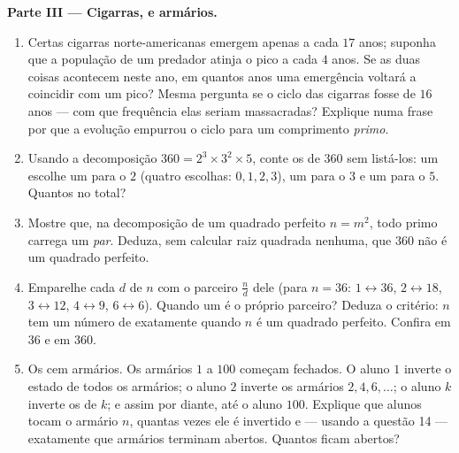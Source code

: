 \begin{problem}
\medskip
\noindent\textbf{Parte III --- Cigarras,  e armários.}
\begin{enumerate}[resume]
  \item Certas cigarras norte-americanas emergem apenas a cada $17$
        anos; suponha que a população de um predador atinja o pico a
        cada $4$ anos. Se as duas coisas acontecem neste ano, em quantos
        anos uma emergência voltará a coincidir com um pico? Mesma
        pergunta se o ciclo das cigarras fosse de $16$ anos --- com que
        frequência elas seriam massacradas? Explique numa frase por que
        a evolução empurrou o ciclo para um comprimento \emph{primo}.
  \item Usando a decomposição $360 = 2^3 \times 3^2 \times 5$, conte os
         de $360$ sem listá-los: um  escolhe um
         para o $2$ (quatro escolhas: $0, 1, 2, 3$), um para o
        $3$ e um para o $5$. Quantos  no total?
  \item Mostre que, na decomposição de um quadrado perfeito $n = m^2$,
        todo primo carrega um  \emph{par}. Deduza, sem calcular
        raiz quadrada nenhuma, que $360$ não é um quadrado perfeito.
  \item Emparelhe cada  $d$ de $n$ com o parceiro $\frac{n}{d}$
        dele (para $n = 36$: $1 \leftrightarrow 36$,
        $2 \leftrightarrow 18$, $3 \leftrightarrow 12$,
        $4 \leftrightarrow 9$, $6 \leftrightarrow 6$). Quando um
         é o próprio parceiro? Deduza o critério: $n$ tem um
        número \emph{} de  exatamente quando $n$ é um
        quadrado perfeito. Confira em $36$ e em $360$.
  \item Os cem armários. Os armários $1$ a $100$ começam fechados. O
        aluno $1$ inverte o estado de todos os armários; o aluno $2$
        inverte os armários $2, 4, 6, \dots$; o aluno $k$ inverte os
         de $k$; e assim por diante, até o aluno $100$.
        Explique que alunos tocam o armário $n$, quantas vezes ele é
        invertido e --- usando a questão 14 --- exatamente que armários
        terminam abertos. Quantos ficam abertos?
\end{enumerate}
\end{problem}
